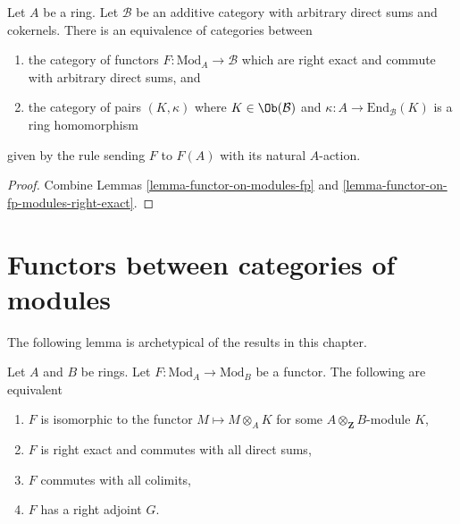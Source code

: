 \begin{lemma}
\label{lemma-functor-on-modules}
Let $A$ be a ring. Let $\mathcal{B}$ be an additive category
with arbitrary direct sums and cokernels. There is an equivalence
of categories between
\begin{enumerate}
\item the category of functors $F : \text{Mod}_A \to \mathcal{B}$
which are right exact and commute with arbitrary direct sums, and
\item the category of pairs $(K, \kappa)$ where $K \in \Ob(\mathcal{B})$
and $\kappa : A \to \text{End}_\mathcal{B}(K)$ is a ring homomorphism
\end{enumerate}
given by the rule sending $F$ to $F(A)$ with its natural $A$-action.
\end{lemma}

\begin{proof}
Combine Lemmas \ref{lemma-functor-on-modules-fp} and
\ref{lemma-functor-on-fp-modules-right-exact}.
\end{proof}






\section{Functors between categories of modules}
\label{section-functors}

\noindent
The following lemma is archetypical of the results in this chapter.

\begin{lemma}
\label{lemma-functor}
Let $A$ and $B$ be rings. Let $F : \text{Mod}_A \to \text{Mod}_B$
be a functor. The following are equivalent
\begin{enumerate}
\item $F$ is isomorphic to the functor $M \mapsto M \otimes_A K$
for some $A \otimes_\mathbf{Z} B$-module $K$,
\item $F$ is right exact and commutes with all direct sums,
\item $F$ commutes with all colimits,
\item $F$ has a right adjoint $G$.
\end{enumerate}
\end{lemma}

